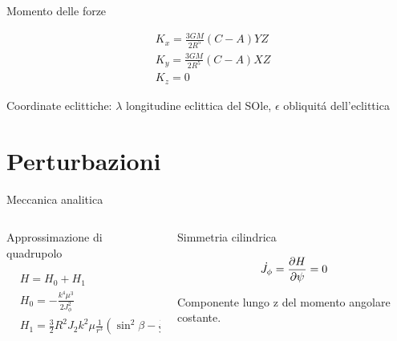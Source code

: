 \begin{wordonframe}{Momento delle forze}

\begin{align*}
&K_x=\frac{3GM}{2R^5}(C-A)YZ\\
&K_y=\frac{3GM}{2R^5}(C-A)XZ\\
&K_z=0
\end{align*}

Coordinate eclittiche: $\lambda$ longitudine eclittica del SOle, $\epsilon$ obliquit\'a dell'eclittica

\end{wordonframe}


\section{Perturbazioni}

\begin{frame}{Meccanica analitica}

\begin{columns}  \begin{column}{0.5\textwidth}

\begin{block}{Approssimazione di quadrupolo}

\begin{align*}
&H=H_0+H_1\\
&H_0=-\frac{k^4\mu^3}{2J_{\phi}^2}\\
&H_1=\frac{3}{2}R^2J_2k^2\mu\frac{1}{r^3}(\sin^2{\beta}-\frac{1}{3})
\end{align*}


\end{block}

\end{column}

\begin{column}{0.5\textwidth}

\begin{block}{Simmetria cilindrica}

\begin{equation*}
\dot{J_{\phi}}=\frac{\partial H}{\partial \psi}=0
\end{equation*}

Componente lungo z del momento angolare costante.

\end{block}


\end{column}  \end{columns}


\end{frame}



